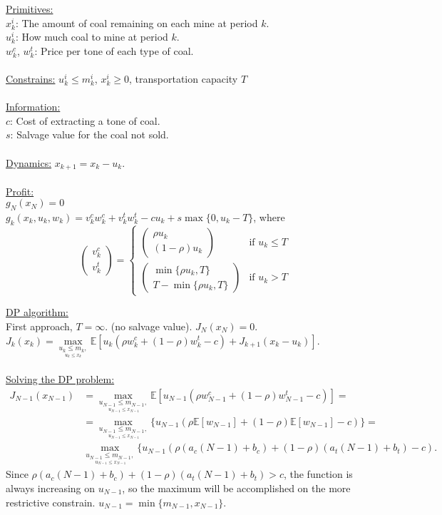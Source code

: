 \documentclass[11pt, english]{article}
\begin{document}
\underline{Primitives:}\\
$x_k^i$: The amount of coal remaining on each mine at period $k$.\\
$u_k^i$: How much coal to mine at period $k$. \\
$w_k^c$, $w_k^t$: Price per tone of each type of coal.\\\\
\underline{Constrains:} $u_k^i\leq m_k^i$, $x_k^i\geq 0$, transportation capacity $T$\\\\
\underline{Information:}\\
$c$: Cost of extracting a tone of coal.\\
$s$: Salvage value for the coal not sold.\\\\
\underline{Dynamics:}
$x_{k+1}=x_k-u_k$.\\\\
\underline{Profit:}\\
$g_N(x_N)=0$\\
$g_k(x_k,u_k,w_k)=v_k^cw_k^c+v_k^tw_k^t-cu_k+s\max\{0,u_k-T\}$, where $$\left(\begin{array}{c}
v_k^c\\
v_k^t
\end{array}\right)=\left\{\begin{array}{ll}
\left(\begin{array}{c}
\rho u_k\\
(1-\rho)u_k
\end{array}\right) & \text{if } u_k\leq T\\
\left(\begin{array}{c}
\min\{\rho u_k,T\}\\
T-\min\{\rho u_k,T\}
\end{array}\right) & \text{if } u_k> T
\end{array}\right.$$

\underline{DP algorithm:}\\
First approach, $T=\infty$. (no salvage value).
$J_N(x_N)=0$.\\
$J_{k}(x_k)=\underset{\underset{u_{k}\leq x_{k}}{u_{k}\leq m_{k},}}{\max}\mathbb{E}[u_k(\rho w_k^c+(1-\rho)w_k^t-c)+J_{k+1}(x_k-u_k)]$.\\\\

\underline{Solving the DP problem:}\\
\begin{align}
	J_{N-1}(x_{N-1})&=\underset{\underset{\ u_{N-1}\leq x_{N-1}}{u_{N-1}\leq m_{N-1},}}{\max}\mathbb{E}[u_{N-1}(\rho w_{N-1}^c+(1-\rho)w_{N-1}^t-c)]=\\
	&=\underset{\underset{\ u_{N-1}\leq x_{N-1}}{u_{N-1}\leq m_{N-1},}}{\max}\{u_{N-1}(\rho\mathbb{E}[w_{N-1}]+(1-\rho)\mathbb{E}[w_{N-1}]-c)\}=\\
	&\underset{\underset{\ u_{N-1}\leq x_{N-1}}{u_{N-1}\leq m_{N-1},}}{\max}\{u_{N-1}(\rho(a_c(N-1)+b_c)+(1-\rho)(a_t(N-1)+b_t)-c).
\end{align}
Since $\rho(a_c(N-1)+b_c)+(1-\rho)(a_t(N-1)+b_t)>c$, the function is always increasing on $u_{N-1}$, so the maximum will be accomplished on the more restrictive constrain. $u_{N-1}=\min\{m_{N-1},x_{N-1}\}$.
 
\end{document}
